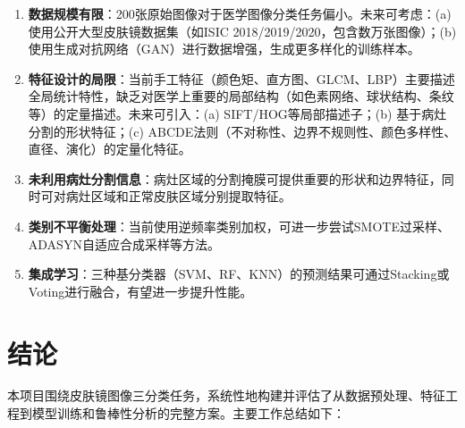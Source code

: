 \documentclass[UTF8,a4paper,12pt]{ctexart}
\numberwithin{figure}{section}
\numberwithin{table}{section}
\begin{document}
\begin{enumerate}
    \item \textbf{数据规模有限}：200张原始图像对于医学图像分类任务偏小。未来可考虑：(a) 使用公开大型皮肤镜数据集（如ISIC 2018/2019/2020，包含数万张图像）；(b) 使用生成对抗网络（GAN）进行数据增强，生成更多样化的训练样本。

    \item \textbf{特征设计的局限}：当前手工特征（颜色矩、直方图、GLCM、LBP）主要描述全局统计特性，缺乏对医学上重要的局部结构（如色素网络、球状结构、条纹等）的定量描述。未来可引入：(a) SIFT/HOG等局部描述子；(b) 基于病灶分割的形状特征；(c) ABCDE法则（不对称性、边界不规则性、颜色多样性、直径、演化）的定量化特征。

    \item \textbf{未利用病灶分割信息}：病灶区域的分割掩膜可提供重要的形状和边界特征，同时可对病灶区域和正常皮肤区域分别提取特征。

    \item \textbf{类别不平衡处理}：当前使用逆频率类别加权，可进一步尝试SMOTE过采样、ADASYN自适应合成采样等方法。

    \item \textbf{集成学习}：三种基分类器（SVM、RF、KNN）的预测结果可通过Stacking或Voting进行融合，有望进一步提升性能。
\end{enumerate}

\section{结论}\label{sec:conclusion}

本项目围绕皮肤镜图像三分类任务，系统性地构建并评估了从数据预处理、特征工程到模型训练和鲁棒性分析的完整方案。主要工作总结如下：
\end{document}
